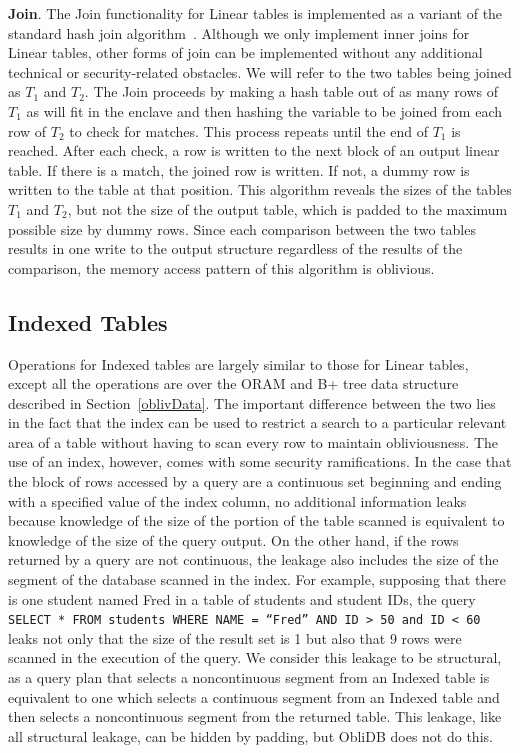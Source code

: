 \documentclass[letterpaper,twocolumn,10pt]{article}
\def\name/{ObliDB}
\begin{document}
  \noindent \textbf{Join}. 
The Join functionality for Linear tables is implemented as a variant of the standard hash join algorithm~\cite{EN10}. Although we only implement inner joins for Linear tables, other forms of join can be implemented without any additional technical or security-related obstacles. We will refer to the two tables being joined as $T_1$ and $T_2$. The Join proceeds by making a hash table out of as many rows of $T_1$ as will fit in the enclave and then hashing the variable to be joined from each row of $T_2$ to check for matches. This process repeats until the end of $T_1$ is reached. After each check, a row is written to the next block of an output linear table. If there is a match, the joined row is written. If not, a dummy row is written to the table at that position. This algorithm reveals the sizes of the tables $T_1$ and $T_2$, but not the size of the output table, which is padded to the maximum possible size by dummy rows. Since each comparison between the two tables results in one write to the output structure regardless of the results of the comparison, the memory access pattern of this algorithm is oblivious. 

\subsection{Indexed Tables}

Operations for Indexed tables are largely similar to those for Linear tables, except all the operations are over the ORAM and B+ tree data structure described in Section~\ref{oblivData}. The important difference between the two lies in the fact that the index can be used to restrict a search to a particular relevant area of a table without having to scan every row to maintain obliviousness. The use of an index, however, comes with some security ramifications. In the case that the block of rows accessed by a query are a continuous set beginning and ending with a specified value of the index column, no additional information leaks because knowledge of the size of the portion of the table scanned is equivalent to knowledge of the size of the query output. On the other hand, if the rows returned by a query are not continuous, the leakage also includes the size of the segment of the database scanned in the index. For example, supposing that there is one student named Fred in a table of students and student IDs,  the query \texttt{SELECT * FROM students WHERE NAME = ``Fred'' AND ID > 50 and ID < 60} leaks not only that the size of the result set is 1 but also that 9 rows were scanned in the execution of the query. We consider this leakage to be structural, as a query plan that selects a noncontinuous segment from an Indexed table is equivalent to one which selects a continuous segment from an Indexed table and then selects a noncontinuous segment from the returned table. This leakage, like all structural leakage, can be hidden by padding, but \name/ does not do this. 
\end{document}
